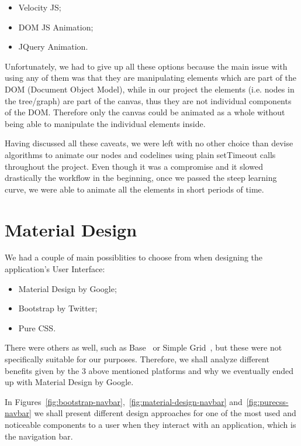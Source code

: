 \documentclass{l4proj}
\begin{document}
\begin{itemize}
    \item Velocity JS;
    \item DOM JS Animation;
    \item JQuery Animation.
\end{itemize}

Unfortunately, we had to give up all these options because the main issue with using any of them was that they are
manipulating elements which are part of the DOM (Document Object Model), while in our project the elements (i.e. nodes
in the tree/graph) are part of
the canvas, thus they are not individual components of the DOM. Therefore only the canvas could be animated as a whole without being able to manipulate the individual elements inside.

Having discussed all these caveats, we were left with no other choice than devise algorithms to animate our nodes and
codelines using plain setTimeout calls throughout the project. Even though it was a compromise and it slowed
drastically the workflow in the beginning, once we passed the steep learning curve, we were able to animate all the
elements in short periods of time.

\section{Material Design}

We had a couple of main possiblities to choose from when designing the application's User Interface:

\begin{itemize}
    \item Material Design by Google;
    \item Bootstrap by Twitter;
    \item Pure CSS.
\end{itemize}

There were others as well, such as Base~\cite{base-ui} or Simple Grid~\cite{simple-grid-ui}, but these were not specifically suitable for
our purposes. Therefore, we shall analyze different benefits given by the 3 above mentioned platforms and why we
eventually ended up with Material Design by Google.

In Figures~\ref{fig:bootstrap-navbar},~\ref{fig:material-design-navbar} and~\ref{fig:purecss-navbar} we shall present
different design approaches for one of the most used and noticeable components to a user when they interact with an
application, which is the navigation bar.
\end{document}
